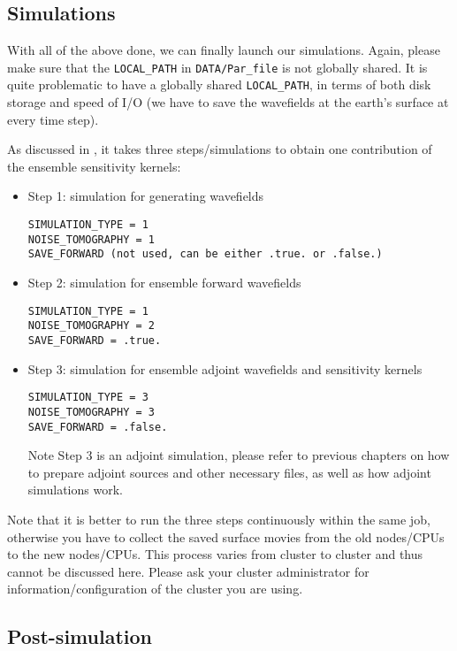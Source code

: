 \subsection{Simulations}

With all of the above done, we can finally launch our simulations.
Again, please make sure that the \texttt{LOCAL\_PATH} in \texttt{DATA/Par\_file}
is not globally shared. It is quite problematic to have a globally
shared \texttt{LOCAL\_PATH}, in terms of both disk storage and speed
of I/O (we have to save the wavefields at the earth's surface at every
time step).

As discussed in \citet{trompetal2010}, it takes three steps/simulations
to obtain one contribution of the ensemble sensitivity kernels:
\begin{itemize}
\item Step 1: simulation for generating wavefields
\begin{verbatim}
SIMULATION_TYPE = 1
NOISE_TOMOGRAPHY = 1
SAVE_FORWARD (not used, can be either .true. or .false.)
\end{verbatim}

\item Step 2: simulation for ensemble forward wavefields
\begin{verbatim}
SIMULATION_TYPE = 1
NOISE_TOMOGRAPHY = 2
SAVE_FORWARD = .true.
\end{verbatim}

\item Step 3: simulation for ensemble adjoint wavefields and sensitivity
kernels
\begin{verbatim}
SIMULATION_TYPE = 3
NOISE_TOMOGRAPHY = 3
SAVE_FORWARD = .false.
\end{verbatim}

Note Step 3 is an adjoint simulation, please refer to previous chapters
on how to prepare adjoint sources and other necessary files, as well
as how adjoint simulations work.

\end{itemize}
Note that it is better to run the three steps continuously within
the same job, otherwise you have to collect the saved surface movies
from the old nodes/CPUs to the new nodes/CPUs. This process varies
from cluster to cluster and thus cannot be discussed here. Please
ask your cluster administrator for information/configuration of the
cluster you are using.\\



\subsection{Post-simulation}

